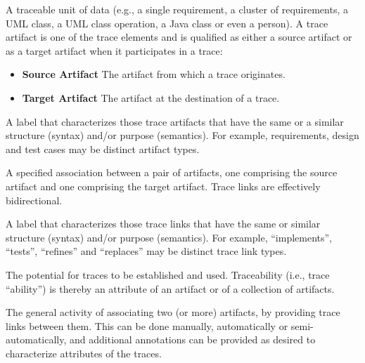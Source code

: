 \begin{definition}
A traceable unit of data (e.g., a single requirement, a cluster of requirements, a UML class, a UML class operation, a Java class or even a person).
A trace artifact is one of the trace elements and is qualified as either a source artifact or as a target artifact when it participates in a trace:
\begin{itemize}
\item
\textbf{Source Artifact}
The artifact from which a trace originates.
\item
\textbf{Target Artifact}
The artifact at the destination of a trace.
\end{itemize}
\cite{DBLP:books/daglib/p/GotelCHZEGDAMM12}
\end{definition}

\begin{definition}
A label that characterizes those trace artifacts that have the same or a similar structure (syntax) and/or purpose (semantics).
For example, requirements, design and test cases may be distinct artifact types.
\cite{DBLP:books/daglib/p/GotelCHZEGDAMM12}
\end{definition}

\begin{definition}
A specified association between a pair of artifacts, one comprising the source artifact and one comprising the target artifact. 
Trace links are effectively bidirectional. 
\cite{DBLP:books/daglib/p/GotelCHZEGDAMM12} 
\end{definition}

\begin{definition}
A label that characterizes those trace links that have the
same or similar structure (syntax) and/or purpose (semantics). 
For example, “implements”, “tests”, “refines” and “replaces” may be distinct trace link types. 
\cite{DBLP:books/daglib/p/GotelCHZEGDAMM12} 
\end{definition}

\begin{definition}[Traceability]
The potential for traces to be established and used.
Traceability (i.e., trace “ability”) is thereby an attribute of an artifact or of a collection of artifacts.
\cite{DBLP:books/daglib/p/GotelCHZEGDAMM12} 
\end{definition}

\begin{definition}
The general activity of associating two (or more) artifacts, by providing trace links between them. 
This can be done manually, automatically or semi-automatically, and additional annotations can be provided as desired to characterize attributes of the traces.
\cite{DBLP:books/daglib/p/GotelCHZEGDAMM12}
\end{definition}

